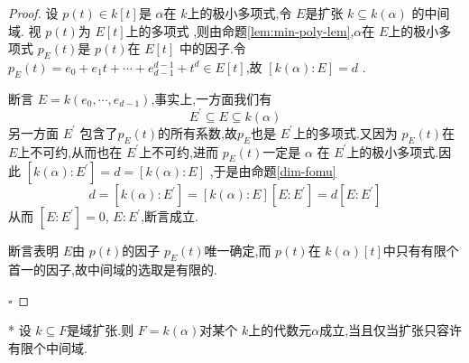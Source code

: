 \documentclass[lang=cn,12pt,color=green,fontset=none,pad]{elegantbook}
\begin{document}
\begin{proof}
    设 \(  p\left( t \right) \in k[t]   \)是 \(  \alpha  \)在 \(  k  \)上的极小多项式,令 \(  E  \)是扩张 \(  k \subseteq k\left( \alpha \right)   \)  的中间域.
    视 \(  p\left( t \right)   \)为 \(  E[t]  \)上的多项式  ,则由命题\ref{lem:min-poly-lem},\(  \alpha  \)在 \(  E  \)上的极小多项式 \(  p_{E}\left( t \right)   \)是 \(  p\left( t \right)   \)在 \(  E[t]  \)  中的因子.令 \(  p_{E}\left( t \right) = e_0+ e_1t+ \cdots + e_{d-1}^{d-1}+ t ^{d} \in E[t]   \),故 \(  [k\left( \alpha \right):E ]=d  \)  .

    断言 \(  E=k\left(  e_0,\cdots,e_{d-1}  \right)   \),事实上,一方面我们有 \[
    E^{\prime} \subseteq E \subseteq k\left( \alpha \right) 
    \]另一方面 \(  E^{\prime}   \)  包含了\(  p_{E}\left( t \right)   \)的所有系数,故\(  p_{E}  \)也是 \(  E^{\prime}   \)上的多项式.又因为 \(  p_{E}\left( t \right)   \)在 \(  E  \)上不可约,从而也在 \(  E^{\prime}   \)上不可约,进而 \(  p_{E}\left( t \right)   \)一定是 \(  \alpha  \)  在 \(  E^{\prime}   \)上的极小多项式.因此 \(  [k\left( \alpha \right):E^{\prime}  ]  =d = [k\left( \alpha \right):E ]\)  
    ,于是由命题\ref{dim-fomu} \[
    d = [k\left( \alpha \right):E^{\prime}  ] = [k\left(  \alpha  \right):E ][E:E^{\prime} ]=d [E:E^{\prime} ]
    \]从而 \(  [E:E^{\prime} ]=0  \), \(  E:E^{\prime}   \),断言成立.
    
    断言表明 \(  E  \)由 \(  p\left( t \right)   \)的因子 \(  p_{E}\left( t \right)   \)唯一确定,而 \(  p\left( t \right)   \)在 \(  k\left( \alpha \right)[t]   \)中只有有限个首一的因子,故中间域的选取是有限的.  
    
    \hfill $\square$
\end{proof}
     
\begin{theorem}{*}
    设 \(  k \subseteq F  \)是域扩张.则 \(  F=k\left( \alpha \right)   \)对某个 \(  k  \)上的代数元\(   \alpha   \)成立,当且仅当扩张只容许有限个中间域.
\end{theorem}
   
\end{document}
